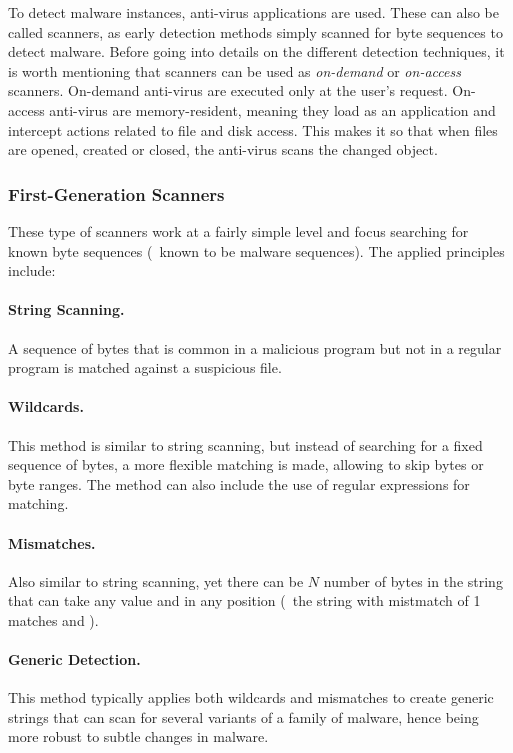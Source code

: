 To detect malware instances, anti-virus applications are used.
These can also be called scanners, as early detection methods simply scanned for byte sequences to detect malware.
Before going into details on the different detection techniques, it is worth mentioning that scanners can be used as \textit{on-demand} or \textit{on-access} scanners.
On-demand anti-virus are executed only at the user's request.
On-access anti-virus are memory-resident, meaning they load as an application and intercept actions related to file and disk access.
This makes it so that when files are opened, created or closed, the anti-virus scans the changed object.

\subsubsection{First-Generation Scanners}
\label{subsection:first_gen_scanners}

These type of scanners work at a fairly simple level and focus searching for known byte sequences (\ie\ known to be malware sequences).
The applied principles include:

\paragraph{String Scanning.} A sequence of bytes that is common in a malicious program but not in a regular program is matched against a suspicious file. 

\paragraph{Wildcards.} This method is similar to string scanning, but instead of searching for a fixed sequence of bytes, a more flexible matching is made, allowing to skip bytes or byte ranges.
The method can also include the use of regular expressions for matching.

\paragraph{Mismatches.} Also similar to string scanning, yet there can be $N$ number of bytes in the string that can take any value and in any position (\eg\ the string  with mistmatch of 1 matches  and ).

\paragraph{Generic Detection.} This method typically applies both wildcards and mismatches to create generic strings that can scan for several variants of a family of malware, hence being more robust to subtle changes in malware.

